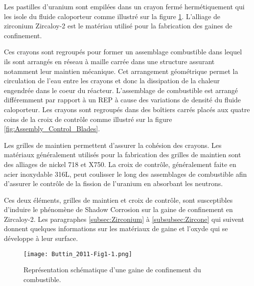 \begin{refsection}
    Les pastilles d’uranium sont empilées dans un crayon fermé hermétiquement qui
    les isole du fluide caloporteur comme illustré sur la figure \ref{fig:fuel_rod}.
    L’alliage de zirconium Zircaloy-2 est le matériau utilisé pour la fabrication
    des gaines de confinement.

    

    Ces crayons sont regroupés pour former un assemblage combustible dans lequel ils
    sont arrangés en réseau à maille carrée dans une structure assurant notamment
    leur maintien mécanique. Cet arrangement géométrique permet la circulation de
    l’eau entre les crayons et donc la dissipation de la chaleur
    engendrée dans le coeur du réacteur. L’assemblage de combustible est arrangé
    différemment par rapport à un REP à cause des variations de densité du fluide
    caloporteur. Les crayons sont regroupés dans des boîtiers carrés placés aux
    quatre coins de la croix de contrôle comme illustré sur la figure
    \ref{fig:Assembly_Control_Blades}.

    Les grilles de maintien permettent d’assurer la cohésion des crayons.
    Les matériaux généralement utilisés pour la fabrication des grilles de maintien sont des alliages de nickel 718 et
    X750.
    La croix de contrôle, généralement faite en acier
    inoxydable 316L, peut coulisser le long des assemblages de combustible afin
    d’assurer le contrôle de la fission de l’uranium en absorbant les neutrons. 

    Ces deux éléments, grilles de maintien et croix de contrôle, sont
    susceptibles d'induire le phénomène de Shadow Corrosion sur la gaine de confinement en
    Zircaloy-2. 
    Les paragraphes \ref{subsec:Zirconium} à \ref{subsubsec:Zircone} qui suivent donnent quelques informations sur les
    matériaux de gaine et l'oxyde qui se développe à leur surface.

    \newpage
    \begin{figure}[H] 
 		\centering 
 		\texttt{[image: Buttin\_2011-Fig1-1.png]} 
 		\caption[Représentation schématique d'une gaine de confinement du combustible.]
        {Représentation schématique d'une gaine de confinement du combustible\citep{Coppolani2004}.} 
 		\label{fig:fuel_rod} 
 	\end{figure}


\end{refsection}
